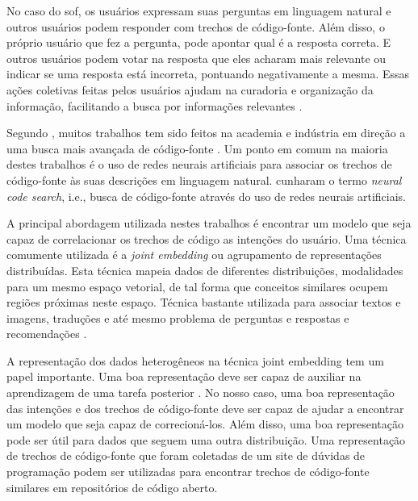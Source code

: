No caso do \Gls{sof}, os usuários expressam suas perguntas em linguagem natural e outros usuários podem responder com trechos de código-fonte. Além disso, o próprio usuário que fez a pergunta, pode apontar qual é a resposta correta. E outros usuários podem votar na resposta que eles acharam mais relevante ou indicar se uma resposta está incorreta, pontuando negativamente a mesma. Essas ações coletivas feitas pelos usuários ajudam na curadoria e organização da informação, facilitando a busca por informações relevantes \citep{Wang-quora:2013, cambronero-deep-learning-code-search:2019}. 




Segundo \cite{cambronero-deep-learning-code-search:2019}, muitos trabalhos tem sido feitos na academia e indústria em direção a uma busca mais avançada de código-fonte \citep{Gu-deep-code-search:2018, yao-2018, iyer-etal-2016-summarizing, Allamanis-bimodal-source-code-natural-language:2015, Chen-bi-variational-autoencoder:2018, Sachdev-neural-code-search:2018, cambronero-deep-learning-code-search:2019}. Um ponto em comum na maioria destes trabalhos é o uso de redes neurais artificiais para associar os trechos de código-fonte às suas descrições em linguagem natural. \cite{cambronero-deep-learning-code-search:2019} cunharam o termo \textit{neural code search}, i.e., busca de código-fonte através do uso de redes neurais artificiais.





A principal abordagem utilizada nestes trabalhos é encontrar um \gls{modelo} que seja capaz de correlacionar os trechos de código as intenções do usuário. Uma técnica comumente utilizada é a \textit{joint embedding} ou agrupamento de representações distribuídas. Esta técnica mapeia dados de diferentes distribuições, modalidades para um mesmo espaço vetorial, de tal forma que conceitos similares ocupem regiões próximas neste espaço. Técnica bastante utilizada para associar textos e imagens, traduções e até mesmo problema de perguntas e respostas e recomendações \citep{lai-etal-2018-review, Zhang:2019:deep-learning-recommender-survey}.

A representação dos dados heterogêneos na técnica joint embedding tem um papel importante. Uma boa representação deve ser capaz de auxiliar na aprendizagem de uma tarefa
posterior \citep{Goodfellow-et-al-2016:representation-learning}. No nosso caso, uma boa representação das intenções e dos trechos de código-fonte deve ser capaz de ajudar a encontrar um modelo que seja capaz de correcioná-los. Além disso, uma boa representação pode ser útil para dados que seguem uma outra distribuição. Uma representação de trechos de código-fonte que foram coletadas de um site de dúvidas de programação podem ser utilizadas para encontrar trechos de código-fonte similares em repositórios de código aberto.

